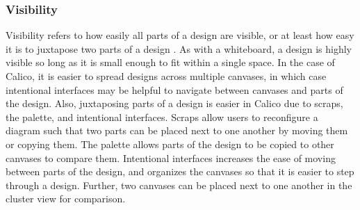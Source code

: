 \documentclass[12pt,fleqn]{ucithesis}
\begin{document}




\subsubsection{Visibility}

Visibility refers to how easily all parts of a design are visible, or at least how easy it is to juxtapose two parts of a design \cite{Petre2013BookChapter}. As with a whiteboard, a design is highly visible so long as it is small enough to fit within a single space. In the case of Calico, it is easier to spread designs across multiple canvases, in which case intentional interfaces may be helpful to navigate between canvases and parts of the design. Also, juxtaposing parts of a design is easier in Calico due to scraps, the palette, and intentional interfaces. Scraps allow users to reconfigure a diagram such that two parts can be placed next to one another by moving them or copying them. The palette allows parts of the design to be copied to other canvases to compare them. Intentional interfaces increases the ease of moving between parts of the design, and organizes the canvases so that it is easier to step through a design. Further, two canvases can be placed next to one another in the cluster view for comparison.
\end{document}

